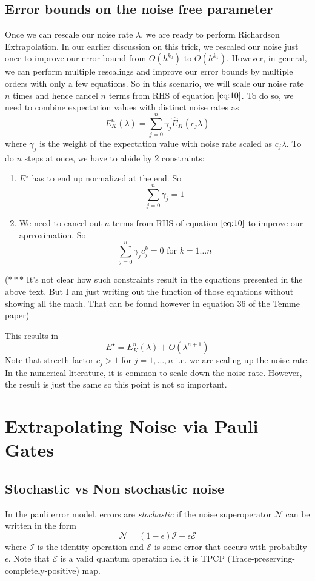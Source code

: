 \documentclass{article}
\begin{document}
\subsection{Error bounds on the noise free parameter}
Once we can rescale our noise rate \(\lambda\), we are ready to perform
Richardson Extrapolation. In our earlier discussion on this trick, we rescaled
our noise just once to improve our error bound from \(O(h^{k_0})\) to \(O(h^{k_1})\).
However, in general, we can perform multiple rescalings and improve our
error bounds by multiple orders with only a few equations. So in this scenario,
we will scale our noise rate \(n\) times and hence cancel \(n\) terms from
RHS of equation \(\ref{eq:10}\). To do so, we need to combine
expectation values with distinct noise rates as
\begin{equation}
  E^n_{K}(\lambda) = \sum^n_{j=0} \gamma_j \hat{E}_K(c_j \lambda)
\end{equation}
where \(\gamma_j\) is the weight of the expectation value with noise rate
scaled as \(c_j \lambda\). To do \(n\) steps at once, we have to abide by 2
constraints:
\begin{enumerate}
  \item \(E^\star\) has to end up normalized at the end. So
  \[\sum_{j=0}^n \gamma_j= 1\]
  \item We need to cancel out \(n\) terms from RHS of equation \(\ref{eq:10}\)
   to improve our aprroximation. So
   \[\sum_{j=0}^n \gamma_j c^k_j= 0 \text{  for  } k = 1 \ldots n\]
\end{enumerate}
(\(***\) It's not clear how such constraints result in the equations presented in the above text. But I am just writing out the function of those equations without showing all the math. That can be found however in equation 36 of the Temme paper)


This results in
\[E^\star = E^n_{K}(\lambda) + O(\lambda^{n+1}) \]
Note that strecth factor \(c_j >1\) for \(j = 1, \ldots, n\) i.e. we are scaling up the noise rate. In the numerical literature, it is common to scale down the noise rate. However, the result is just the same so this point is not so important.

\section{Extrapolating Noise via Pauli Gates}
\subsection{Stochastic vs Non stochastic noise}
In the pauli error model, errors are \textit{stochastic} if the noise superoperator \(\mathcal{N}\) can be written in the form
\begin{equation} \label{eq101}
\mathcal{N} = (1-\epsilon)\mathcal{I} + \epsilon\mathcal{E}
\end{equation}
where \(\mathcal{I}\) is the identity operation and \(\mathcal{E}\) is some
error that occurs with probabilty \(\epsilon\). Note that \(\mathcal{E}\) is a
valid quantum operation i.e. it is TPCP (Trace-preserving-completely-positive)
map.
\end{document}
